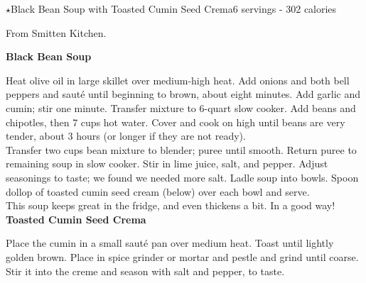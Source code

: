 \begin{recipe}{$\star$Black Bean Soup with Toasted Cumin Seed Crema}{6 servings - 302 calories}{}

\freeform From Smitten Kitchen.


\textbf{Black Bean Soup}

Heat olive oil in large skillet over medium-high heat. Add onions and both bell peppers and sauté until beginning to brown, about eight minutes. Add garlic and cumin; stir one minute. Transfer mixture to 6-quart slow cooker. Add beans and chipotles, then 7 cups hot water. Cover and cook on high until beans are very tender, about 3 hours (or longer if they are not ready).\\

Transfer two cups bean mixture to blender; puree until smooth. Return puree to remaining soup in slow cooker. Stir in lime juice, salt, and pepper. Adjust seasonings to taste; we found we needed more salt. Ladle soup into bowls. Spoon dollop of toasted cumin seed cream (below) over each bowl and serve.\\

This soup keeps great in the fridge, and even thickens a bit. In a good way!\\

\textbf{Toasted Cumin Seed Crema}

Place the cumin in a small sauté pan over medium heat. Toast until lightly golden brown. Place in spice grinder or mortar and pestle and grind until coarse. Stir it into the creme and season with salt and pepper, to taste.

\end{recipe}
